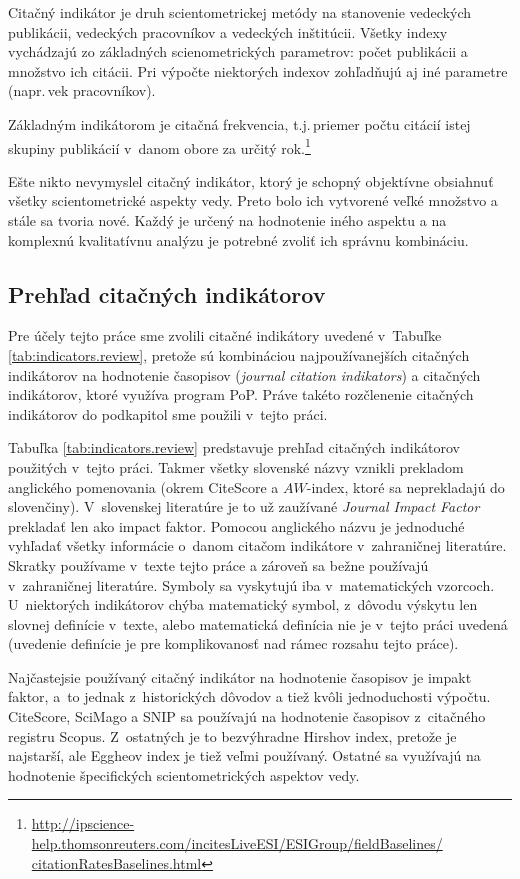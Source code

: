 Citačný indikátor je druh scientometrickej metódy na stanovenie 
vedeckých publikácii, vedeckých pracovníkov a vedeckých inštitúcii.  Všetky
indexy vychádzajú zo základných scienometrických parametrov: počet publikácii a
množstvo ich citácii.  Pri výpočte niektorých indexov zohľadňujú aj iné
parametre (napr.\,vek pracovníkov).

Základným indikátorom je citačná frekvencia, t.j.\,priemer počtu citácií istej
skupiny publikácií v~danom obore za určitý
rok.\footnote{\url{http://ipscience-help.thomsonreuters.com/incitesLiveESI/ESIGroup/fieldBaselines/
citationRatesBaselines.html}}

Ešte nikto nevymyslel citačný indikátor, ktorý je schopný objektívne obsiahnuť
všetky scientometrické aspekty vedy. Preto bolo ich vytvorené veľké množstvo a
stále sa tvoria nové. Každý je určený na hodnotenie iného aspektu a na
komplexnú kvalitatívnu analýzu je potrebné zvoliť ich správnu kombináciu.

\subsection{Prehľad citačných indikátorov}

Pre účely tejto práce sme zvolili citačné indikátory uvedené v~Tabuľke
\ref{tab:indicators.review}, pretože sú kombináciou najpoužívanejších citačných
indikátorov na hodnotenie časopisov (\emph{journal citation indikators}) a
citačných indikátorov, ktoré využíva program PoP.
Práve takéto rozčlenenie citačných indikátorov do podkapitol sme použili
v~tejto práci.

Tabuľka \ref{tab:indicators.review} predstavuje prehľad citačných indikátorov
použitých v~tejto práci. Takmer všetky slovenské názvy vznikli prekladom
anglického pomenovania (okrem CiteScore a $AW$-index, ktoré sa neprekladajú do
slovenčiny).  V~slovenskej literatúre je to už zaužívané \emph{Journal Impact
Factor} prekladať len ako impact faktor.  Pomocou anglického názvu je
jednoduché vyhľadať všetky informácie o~danom citačom indikátore v~zahraničnej
literatúre. Skratky používame v~texte tejto práce a zároveň sa bežne používajú
v~zahraničnej literatúre. Symboly sa vyskytujú iba v~matematických vzorcoch.
U~niektorých indikátorov chýba matematický symbol, z~dôvodu výskytu len slovnej
definície v~texte, alebo matematická definícia nie je v~tejto práci uvedená
(uvedenie definície je pre komplikovanosť nad rámec rozsahu tejto práce).

Najčastejsie používaný citačný indikátor na hodnotenie časopisov je impakt faktor, a~to
jednak z~historických dôvodov a tiež kvôli jednoduchosti výpočtu. CiteScore, SciMago a
SNIP sa používajú na hodnotenie časopisov z~citačného registru Scopus.
Z~ostatných je to bezvýhradne Hirshov index, pretože je najstarší, ale Eggheov
index je tiež veľmi používaný.  Ostatné sa využívajú na hodnotenie špecifických
scientometrických aspektov vedy.

